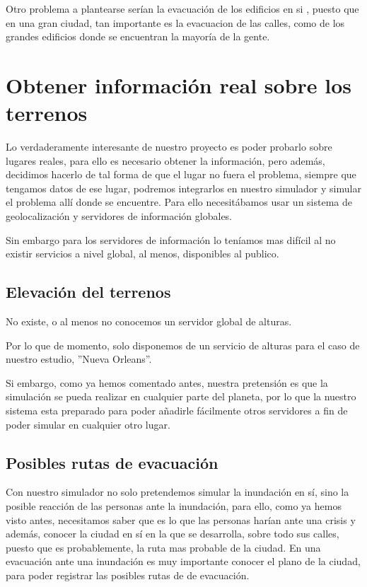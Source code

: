 Otro problema a plantearse serían la evacuación de los edificios en si
\cite{kyoto}, puesto que en una gran ciudad, tan importante es la evacuacion de
las calles, como de los grandes edificios donde se encuentran la mayoría de la
gente.
 

\section*{Obtener información real sobre los terrenos}

Lo verdaderamente interesante de nuestro proyecto es poder probarlo sobre
lugares reales, para ello es necesario obtener la información, pero además,
decidimos hacerlo de tal forma de que el lugar no fuera el problema, siempre que
tengamos datos de ese lugar, podremos integrarlos en nuestro simulador y simular
el problema allí donde se encuentre. Para ello necesitábamos usar un sistema de
geolocalización y servidores de información globales.

Sin embargo para los servidores de información lo teníamos mas difícil al no
existir servicios a nivel global, al menos, disponibles al publico.

\subsection*{Elevación del terrenos}

No existe, o al menos no conocemos un servidor global de alturas.

Por lo que de momento, solo disponemos de un servicio de alturas para el caso de
nuestro estudio, ''Nueva Orleans''.

Si embargo, como ya hemos comentado antes, nuestra pretensión es que la
simulación se pueda realizar en cualquier parte del planeta, por lo que la
nuestro sistema esta preparado para poder añadirle fácilmente otros servidores a
fin de poder simular en cualquier otro lugar. 

\subsection*{Posibles rutas de evacuación}

Con nuestro simulador no solo pretendemos simular la inundación en sí, sino la
posible reacción de las personas ante la inundación, para ello, como ya hemos
visto antes, necesitamos saber que es lo que las personas harían ante una
crisis y además, conocer la ciudad en sí en la que se desarrolla, sobre todo sus
calles, puesto que es probablemente, la ruta mas probable de la ciudad.
En una evacuación ante una inundación es muy importante conocer el plano de la
ciudad, para poder registrar las posibles rutas de de evacuación.

